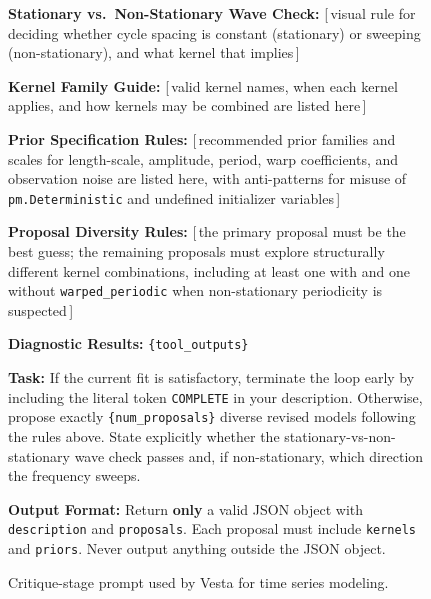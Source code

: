 \documentclass{article}
\newcommand{\method}{{\sc Vesta}}
\begin{document}
\begin{figure}[h]
\begin{mdframed}[linecolor=gray!50, backgroundcolor=gray!5, linewidth=0.8pt]
\medskip
\textbf{Stationary vs.\ Non-Stationary Wave Check:} [\,visual rule for
deciding whether cycle spacing is constant (stationary) or sweeping
(non-stationary), and what kernel that implies\,]

\medskip
\textbf{Kernel Family Guide:} [\,valid kernel names, when each kernel
applies, and how kernels may be combined are listed here\,]

\medskip
\textbf{Prior Specification Rules:} [\,recommended prior families and
scales for length-scale, amplitude, period, warp coefficients, and
observation noise are listed here, with anti-patterns for misuse of
\texttt{pm.Deterministic} and undefined initializer variables\,]

\medskip
\textbf{Proposal Diversity Rules:} [\,the primary proposal must be the best
guess; the remaining proposals must explore structurally different kernel
combinations, including at least one with and one without
\texttt{warped\_periodic} when non-stationary periodicity is suspected\,]

\medskip
\textbf{Diagnostic Results:} \texttt{\{tool\_outputs\}}

\medskip
\textbf{Task:} If the current fit is satisfactory, terminate the loop early
by including the literal token \texttt{COMPLETE} in your description.
Otherwise, propose exactly \texttt{\{num\_proposals\}} diverse revised
models following the rules above. State explicitly whether the
stationary-vs-non-stationary wave check passes and, if non-stationary,
which direction the frequency sweeps.

\medskip
\textbf{Output Format:} Return \textbf{only} a valid JSON object with
\texttt{description} and \texttt{proposals}. Each proposal must include
\texttt{kernels} and \texttt{priors}. Never output anything outside the
JSON object.

\end{mdframed}
\caption{Critique-stage prompt used by \method{} for time series modeling.}
\label{fig:ts-proposal-prompt}
\end{figure}
\end{document}
